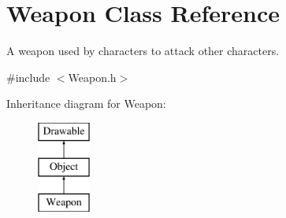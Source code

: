 \hypertarget{class_weapon}{}\section{Weapon Class Reference}
\label{class_weapon}


A weapon used by characters to attack other characters.  




{\ttfamily \#include $<$Weapon.\+h$>$}

Inheritance diagram for Weapon\+:\begin{figure}[H]
\begin{center}
\leavevmode
\includegraphics[height=3.000000cm]{class_weapon}
\end{center}
\end{figure}
